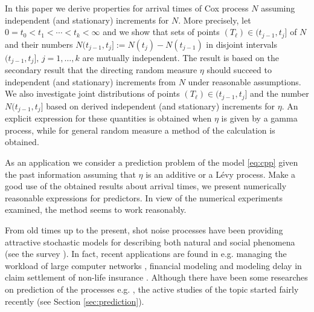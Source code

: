 \documentclass[11pt,leqno%
]{amsart}
\newcommand{\1}{{\mathbf 1}}
\begin{document}
 In this paper we derive properties for arrival times of Cox process $N$ assuming
 independent (and stationary) increments for $N$. More precisely,
 let $0=t_0<t_1<\cdots<t_k<\infty$ and we show that sets of
 points $(T_\ell) \in (t_{j-1},t_j]$ of $N$ and their numbers $N(t_{j-1},t_j]:=N(t_j)-N(t_{j-1})$ in
 disjoint intervals $(t_{j-1},t_j],\,j=1,\ldots,k$ are mutually independent. The result
 is based on the secondary result that the directing random measure
 $\eta$ should succeed to independent (and 
 stationary) increments from $N$ under
 reasonable assumptions. 
 We also investigate joint distributions of points $(T_\ell) \in (t_{j-1},t_j]$ and
 the number $N(t_{j-1},t_j]$ %
 based on derived independent (and stationary) increments for $\eta$. 
 An explicit expression for these
 quantities is obtained when $\eta$ is given by a gamma process, while
 for general random measure a method of the calculation is obtained. 

 As an application we consider a prediction problem of the model \eqref{eq:cpp} given the
 past information assuming that $\eta$ is an additive or a L\'evy
 process. Make a good use of the obtained results about arrival times, 
 we present numerically reasonable expressions for predictors. In view
 of the numerical experiments examined, the method seems to work reasonably.  

 From old times up to the present, shot noise processes have been
 providing attractive stochastic models for describing both natural and social
 phenomena (see the survey \cite{bondesson:2006}). In fact, recent applications are found in e.g. managing the
 workload of large computer networks
 \cite{fay:gonzalez:mikosch:samorodnitsky:2006,mikosch:samorodnitsky:2007},
 financial modeling
 \cite{kluppelberg:kuhn:2004,Kluppelberg:matsui:2015,schimidt:2017} and
 modeling delay in claim settlement of non-life insurance
 \cite{mikosch:2009}. Although there have been some researches on
 prediction of the processes e.g. \cite{LBPJ:1999}, the active studies of the topic started fairly
 recently (see %
 Section \ref{sec:prediction}).  
 
\end{document}
